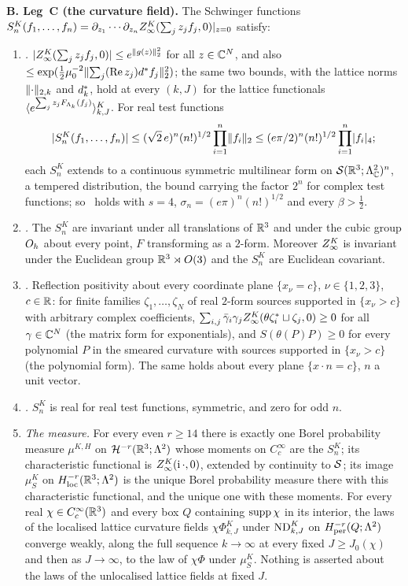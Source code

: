\begin{theorem}
\smallskip\noindent\textbf{B. Leg~C (the curvature field).} The Schwinger functions $S^K_n(f_1,\dots,f_n)=\partial_{z_1}\cdots\partial_{z_n}Z^{K}_{\infty}(\sum_jz_jf_j,0)|_{z=0}$ satisfy:
\begin{enumerate}[label=\textup{(\roman*)},leftmargin=*]
\item \emph{\OSz.} $|Z^{K}_{\infty}(\sum_jz_jf_j,0)|\le e^{\lVert g(z)\rVert_2^2}$ for all $z\in\mathbb C^N$, and also $\le\exp(\frac12\mu_0^{-2}\lVert \sum_j(\operatorname{Re} z_j)d^{*} f_j\rVert_2^2)$; the same two bounds, with the lattice norms $\lVert \cdot\rVert_{2,k}$ and $d^{*}_k$, hold at every $(k,J)$ for the lattice functionals $\langle e^{\sum_jz_jF_{\Lambda_k}(f_j)}\rangle^{K}_{k,J}$. For real test functions
\[
|S^K_n(f_1,\dots,f_n)|\le(\sqrt2\,e)^n(n!)^{1/2}\prod_{i=1}^n\lVert f_i\rVert_2\le(e\pi/2)^n(n!)^{1/2}\prod_{i=1}^n\lvert f_i\rvert_{4};
\]
each $S^K_n$ extends to a continuous symmetric multilinear form on $\mathcal S(\mathbb R^3;\Lambda^2_{\mathbb C})^n$, a tempered distribution, the bound carrying the factor $2^n$ for complex test functions; so \Ezz\ holds with $s=4$, $\sigma_n=(e\pi)^n(n!)^{1/2}$ and every $\beta>\frac12$.
\item \emph{\OSo.} The $S^K_n$ are invariant under all translations of $\mathbb R^3$ and under the cubic group $O_h$ about every point, $F$ transforming as a $2$-form. Moreover $Z^{K}_{\infty}$ is invariant under the Euclidean group $\mathbb R^3\rtimes O(3)$ and the $S^K_n$ are Euclidean covariant.
\item \emph{\OSt.} Reflection positivity about every coordinate plane $\{x_\nu=c\}$, $\nu\in\{1,2,3\}$, $c\in\mathbb R$: for finite families $\zeta_1,\dots,\zeta_N$ of real $2$-form sources supported in $\{x_\nu>c\}$ with arbitrary complex coefficients, $\sum_{i,j}\bar\gamma_i\gamma_jZ^{K}_{\infty}(\theta\zeta_i^*\sqcup\zeta_j,0)\ge0$ for all $\gamma\in\mathbb C^N$ (the matrix form for exponentials), and $S(\theta(P)P)\ge0$ for every polynomial $P$ in the smeared curvature with sources supported in $\{x_\nu>c\}$ (the polynomial form). The same holds about every plane $\{x\cdot n=c\}$, $n$ a unit vector.
\item \emph{\OSth.} $S^K_n$ is real for real test functions, symmetric, and zero for odd $n$.
\item \emph{The measure.} For every even $r\ge14$ there is exactly one Borel probability measure $\mu^{K,H}$ on $\mathcal H^{-r}(\mathbb R^3;\Lambda^2)$ whose moments on $C^\infty_c$ are the $S^K_n$; its characteristic functional is $Z^{K}_{\infty}(\mathrm i\,\cdot,0)$, extended by continuity to $\mathcal S$; its image $\mu^K_S$ on $H^{-r}_{\rm loc}(\mathbb R^3;\Lambda^2)$ is the unique Borel probability measure there with this characteristic functional, and the unique one with these moments. For every real $\chi\in C^\infty_c(\mathbb R^3)$ and every box $Q$ containing $\operatorname{supp}\chi$ in its interior, the laws of the localised lattice curvature fields $\chi\Phi^K_{k,J}$ under $\mathrm{ND}^{K}_{k,J}$ on $H^{-r}_{\rm per}(Q;\Lambda^2)$ converge weakly, along the full sequence $k\to\infty$ at every fixed $J\ge J_0(\chi)$ and then as $J\to\infty$, to the law of $\chi\Phi$ under $\mu^K_S$. Nothing is asserted about the laws of the unlocalised lattice fields at fixed $J$.

\end{enumerate}
\end{theorem}
